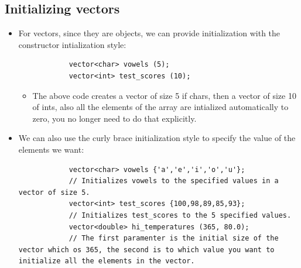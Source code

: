 \subsection{Initializing vectors}
\begin{itemize}
    \item For vectors, since they are objects, we can provide initialization with the constructor intialization style: 
        \begin{verbatim}
            vector<char> vowels (5);
            vector<int> test_scores (10);
        \end{verbatim}
        \begin{itemize}
            \item The above code creates a vector of size 5 if chars, then a vector of size 10 of ints, also all the elements of the array are intialized automatically to zero, you no longer need to do that explicitly.
        \end{itemize}
    
    \item We can also use the curly brace initialization style to specify the value of the elements we want:
        \begin{verbatim}
            vector<char> vowels {'a','e','i','o','u'};
            // Initializes vowels to the specified values in a vector of size 5.
            vector<int> test_scores {100,98,89,85,93};
            // Initializes test_scores to the 5 specified values.
            vector<double> hi_temperatures (365, 80.0);
            // The first paramenter is the initial size of the vector which os 365, the second is to which value you want to initialize all the elements in the vector.
        \end{verbatim}
\end{itemize}


